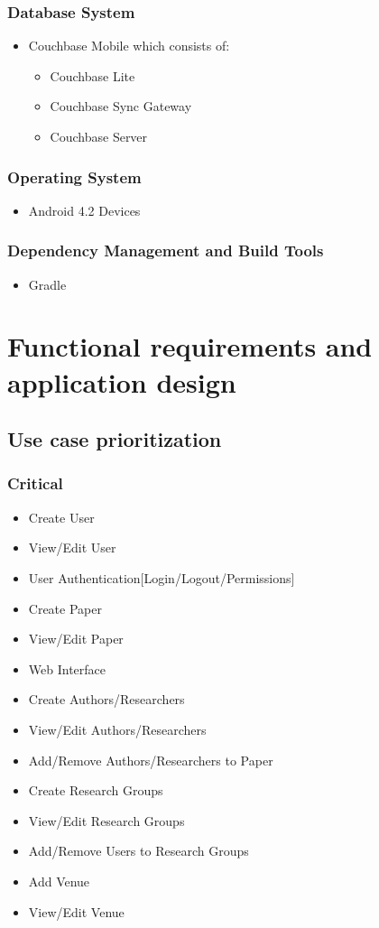 \documentclass[a4paper,10pt]{article}
\begin{document}
\subsubsection{Database System}
	\begin{itemize}
		\item Couchbase Mobile which consists of:
		\begin{itemize}
			\item Couchbase Lite
			\item Couchbase Sync Gateway
			\item Couchbase Server
		\end{itemize}
	\end{itemize}

\subsubsection{Operating System}
	\begin{itemize}
		\item Android 4.2 Devices
	\end{itemize}

\subsubsection{Dependency Management and Build Tools}
	\begin{itemize}
		\item Gradle
	\end{itemize}

\clearpage
\section{Functional requirements and application design}
\subsection{Use case prioritization}
\subsubsection{Critical}
	\begin{itemize}
	  	\item Create User
		\item View/Edit User
		\item User Authentication[Login/Logout/Permissions]
		\item Create Paper
		\item View/Edit Paper
		\item Web Interface
		\item Create Authors/Researchers
		\item View/Edit Authors/Researchers
		\item Add/Remove Authors/Researchers to Paper
		\item Create Research Groups
		\item View/Edit Research Groups
		\item Add/Remove Users to Research Groups
		\item Add Venue
		\item View/Edit Venue
	\end{itemize}
\end{document}
